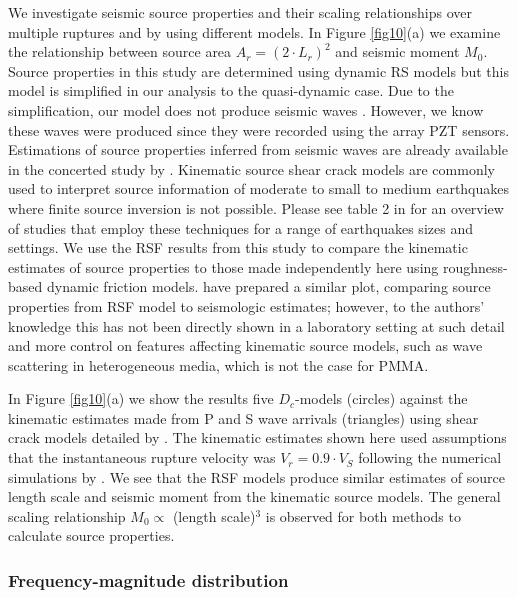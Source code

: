 \documentclass[final,3p, 11pt,authoryear]{elsarticle}
\begin{document}
We investigate seismic source properties and their scaling relationships over multiple ruptures and by using different models. In Figure \ref{fig10}(a) we examine the relationship between source area $A_{r} = (2\cdot L_{r})^{2}$ and seismic moment $M_{0}$. Source properties in this study are determined using dynamic RS models but this model is simplified in our analysis to the quasi-dynamic case. Due to the simplification, our model does not produce seismic waves \citep{Freund1990, Rosakis2002}. However, we know these waves were produced since they were recorded using the array PZT sensors. Estimations of source properties inferred from seismic waves are already available in the concerted study by \citet{Selvadurai2019}.  Kinematic source shear crack models \citep{Brune1970, Madariaga1976, Hanks1979} are commonly used to interpret source information of moderate to small to medium earthquakes where finite source inversion is not possible. Please see table 2 in \citet{Cocco2016} for an overview of studies that employ these techniques for a range of earthquakes sizes and settings. We use the RSF results from this study to compare the kinematic estimates of source properties to those made independently here using roughness-based dynamic friction models. \citet{Chen2009} have prepared a similar plot, comparing source properties from RSF model to seismologic estimates; however, to the authors' knowledge this has not been directly shown in a laboratory setting at such detail and more control on features affecting kinematic source models, such as wave scattering in heterogeneous media, which is not the case for PMMA.

In Figure \ref{fig10}(a) we show the results five $D_{c}$-models (circles) against the kinematic estimates made from P and S wave arrivals (triangles) using shear crack models detailed by \citet{Selvadurai2019}. The kinematic estimates shown here used assumptions that the instantaneous rupture velocity was $V_{r} = 0.9 \cdot V_{S}$ following the numerical simulations by \citet{Madariaga1976}. We see that the RSF models produce similar estimates of source length scale and seismic moment from the kinematic source models.  The general scaling relationship $M_{0}\propto$ (length scale)$^{3}$ is observed for both methods to calculate source properties.

\subsubsection{Frequency-magnitude distribution}
\end{document}
